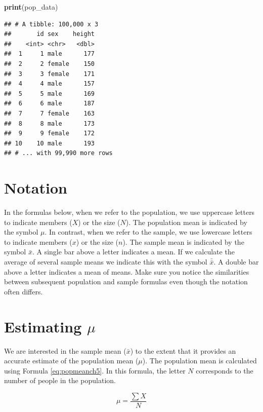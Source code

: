 \documentclass[
]{krantz}
\makeatletter
\newenvironment{Shaded}{\begin{snugshade}}{\end{snugshade}}
\newcommand{\KeywordTok}[1]{\textcolor[rgb]{0.27,0.27,0.27}{\textbf{#1}}}
\newcommand{\NormalTok}[1]{#1}
\newenvironment{kframe}{%
\medskip{}
\setlength{\fboxsep}{.8em}
 \def\at@end@of@kframe{}%
 \ifinner\ifhmode%
  \def\at@end@of@kframe{\end{minipage}}%
  \begin{minipage}{\columnwidth}%
 \fi\fi%
 \def\FrameCommand##1{\hskip\@totalleftmargin \hskip-\fboxsep
 \colorbox{shadecolor}{##1}\hskip-\fboxsep
     \hskip-\linewidth \hskip-\@totalleftmargin \hskip\columnwidth}%
 \MakeFramed {\advance\hsize-\width
   \@totalleftmargin\z@ \linewidth\hsize
   \@setminipage}}%
 {\par\unskip\endMakeFramed%
 \at@end@of@kframe}
\renewenvironment{Shaded}{\begin{kframe}}{\end{kframe}}
\makeatother
\begin{document}
\begin{Shaded}
\begin{Highlighting}[]
\KeywordTok{print}\NormalTok{(pop_data)}
\end{Highlighting}
\end{Shaded}

\begin{verbatim}
## # A tibble: 100,000 x 3
##       id sex    height
##    <int> <chr>   <dbl>
##  1     1 male      177
##  2     2 female    150
##  3     3 female    171
##  4     4 male      157
##  5     5 male      169
##  6     6 male      187
##  7     7 female    163
##  8     8 male      173
##  9     9 female    172
## 10    10 male      193
## # ... with 99,990 more rows
\end{verbatim}

\hypertarget{notation-1}{%
\section{Notation}\label{notation-1}}

In the formulas below, when we refer to the population, we use uppercase letters to indicate members (\(X\)) or the size (\(N\)). The population mean is indicated by the symbol \(\mu\). In contrast, when we refer to the sample, we use lowercase letters to indicate members (\(x\)) or the size (\(n\)). The sample mean is indicated by the symbol \(\bar{x}\). A single bar above a letter indicates a mean. If we calculate the average of several sample means we indicate this with the symbol \(\bar{\bar{x}}\). A double bar above a letter indicates a mean of means. Make sure you notice the similarities between subsequent population and sample formulas even though the notation often differs.

\hypertarget{estimating-mu}{%
\section{\texorpdfstring{Estimating \(\mu\)}{Estimating \textbackslash mu}}\label{estimating-mu}}

We are interested in the sample mean (\(\bar{x}\)) to the extent that it provides an accurate estimate of the population mean (\(\mu\)). The population mean is calculated using Formula \eqref{eq:popmeanch5}. In this formula, the letter \(N\) corresponds to the number of people in the population.

\begin{equation} 
\mu = \frac{\sum{X}}{N}
      \label{eq:popmeanch5}
\end{equation}
\end{document}
